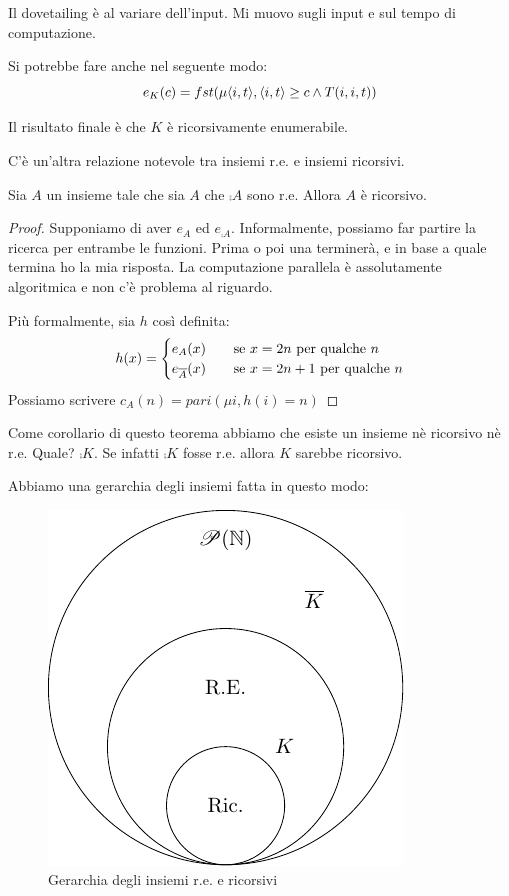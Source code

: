 Il dovetailing è al variare dell'input. Mi muovo sugli input e sul tempo di computazione.

Si potrebbe fare anche nel seguente modo:
\begin{equation*}
    e_{K}(c) = fst(\mu \langle i, t \rangle, \langle i, t \rangle \geq c \land T(i,i,t))
\end{equation*}

Il risultato finale è che $K$ è ricorsivamente enumerabile.

C'è un'altra relazione notevole tra insiemi r.e. e insiemi ricorsivi.

\begin{thm}
    Sia $A$ un insieme tale che sia $A$ che $\comp{A}$ sono r.e. Allora $A$ è ricorsivo.
\end{thm}
\begin{proof}
    Supponiamo di aver $e_{A}$ ed $e_{\comp{A}}$. Informalmente, possiamo far partire la ricerca per
    entrambe le funzioni. Prima o poi una terminerà, e in base a quale termina ho la mia risposta. La
    computazione parallela è assolutamente algoritmica e non c'è problema al riguardo.

    Più formalmente, sia $h$ così definita:
    \begin{equation*}
        h(x) =
        \begin{cases}
            e_{A}(x) \quad &\text{se $x = 2n$ per qualche $n$} \\
            e_{\overline{A}}(x) \quad &\text{se $x = 2n+1$ per qualche $n$} \\
        \end{cases}
    \end{equation*}
    Possiamo scrivere $c_{A}(n) = \textit{pari}(\mu i, h(i) = n)$
\end{proof}

Come corollario di questo teorema abbiamo che esiste un insieme nè ricorsivo nè r.e. Quale?
$\comp{K}$. Se infatti $\comp{K}$ fosse r.e. allora $K$ sarebbe ricorsivo.

Abbiamo una gerarchia degli insiemi fatta in questo modo: 

\begin{figure}[h]
    \centering
    \includegraphics{./img/recursivesets/RecursiveHierarchy.pdf}
    \caption{Gerarchia degli insiemi r.e. e ricorsivi}
\end{figure}

